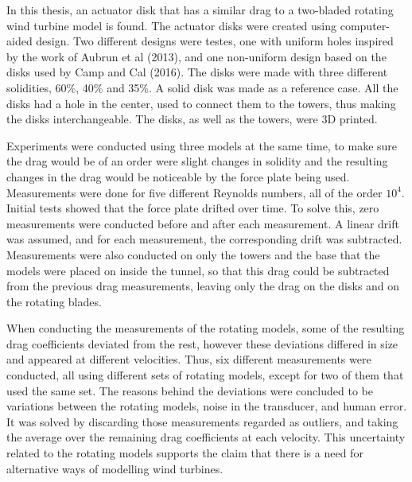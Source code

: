 

In this thesis, an actuator disk that has a similar drag to a two-bladed rotating wind turbine model is found. The actuator disks were created using computer-aided design. Two different designs were testes, one with uniform holes inspired by the work of Aubrun et al (2013)\cite{Aubrun2013}, and one non-uniform design based on the disks used by Camp and Cal (2016)\cite{Camp2016}. The disks were made with three different solidities, 60\%, 40\% and 35\%. A solid disk was made as a reference case. All the disks had a hole in the center, used to connect them to the towers, thus making the disks interchangeable. The disks, as well as the towers, were 3D printed. 

Experiments were conducted using three models at the same time, to make sure the drag would be of an order were slight changes in solidity and the resulting changes in the drag would be noticeable by the force plate being used. Measurements were done for five different Reynolds numbers, all of the order $10^4$. Initial tests showed that the force plate drifted over time. To solve this, zero measurements were conducted before and after each measurement. A linear drift was assumed, and for each measurement, the corresponding drift was subtracted. Measurements were also conducted on only the towers and the base that the models were placed on inside the tunnel, so that this drag could be subtracted from the previous drag measurements, leaving only the drag on the disks and on the rotating blades.  

When conducting the measurements of the rotating models, some of the resulting drag coefficients deviated from the rest, however these deviations differed in size and appeared at different velocities. Thus, six different measurements were conducted, all using different sets of rotating models, except for two of them that used the same set. The reasons behind the deviations were concluded to be variations between the rotating models, noise in the transducer, and human error. It was solved by discarding those measurements regarded as outliers, and taking the average over the remaining drag coefficients at each velocity. This uncertainty related to the rotating models supports the claim that there is a need for alternative ways of modelling wind turbines. 

